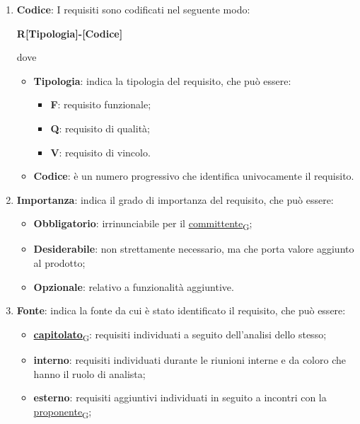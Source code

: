\begin{enumerate}
	\item \textbf{Codice}: I requisiti sono codificati nel seguente modo:
	      \begin{center}
		      \textbf{R[Tipologia]-[Codice]}
	      \end{center}
	      dove
	      \begin{itemize}
			\item \textbf{Tipologia}: indica la tipologia del requisito, che può essere:
			\begin{itemize}
				\item \textbf{F}: requisito funzionale;
				\item \textbf{Q}: requisito di qualità;
				\item \textbf{V}: requisito di vincolo.
			\end{itemize}
			\item \textbf{Codice}: è un numero progressivo che identifica univocamente il requisito.
	      \end{itemize}
	\item \textbf{Importanza}: indica il grado di importanza del requisito, che può essere:
	      \begin{itemize}
		      \item \textbf{Obbligatorio}: irrinunciabile per il \href{https://7last.github.io/docs/rtb/documentazione-interna/glossario\#committente}{committente\textsubscript{G}};
		      \item \textbf{Desiderabile}: non strettamente necessario, ma che porta valore aggiunto al prodotto;
		      \item \textbf{Opzionale}: relativo a funzionalità aggiuntive.
	      \end{itemize}
	\item \textbf{Fonte}: indica la fonte da cui è stato identificato il requisito, che può essere:
	      \begin{itemize}
		      \item \href{https://7last.github.io/docs/rtb/documentazione-interna/glossario\#capitolato}{\textbf{capitolato}\textsubscript{G}}: requisiti individuati a seguito dell'analisi dello stesso;
		      \item \textbf{interno}: requisiti individuati durante le riunioni interne e da coloro che hanno il ruolo di analista;
		      \item \textbf{esterno}: requisiti aggiuntivi individuati in seguito a incontri con la \href{https://7last.github.io/docs/rtb/documentazione-interna/glossario\#proponente}{proponente\textsubscript{G}};

\end{itemize}
\end{enumerate}
